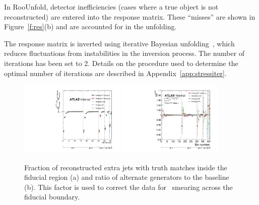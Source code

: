 In RooUnfold, detector inefficiencies (cases where a true object is not reconstructed) are entered into the response matrix.  These
``misses'' are shown in Figure~\ref{f:res}(b) and are accounted for in the unfolding. 

The response matrix is inverted using iterative Bayesian unfolding~\cite{DAgostini:1994zf}, which reduces fluctuations from instabilities in 
the inversion process. The number of iterations has been set to 2. Details on the procedure used to determine the optimal number of iterations are described in Appendix~\ref{app:stressiter}. 
\begin{figure}
\includegraphics[width=0.45\textwidth]{fig/Unfolding/FeedIn.pdf}
\includegraphics[width=0.45\textwidth]{fig/Unfolding/FeedInFrac.pdf}
\caption{Fraction of reconstructed extra jets with truth matches inside the fiducial region (a) and ratio of alternate generators to the baseline (b). This factor is used to correct the data for \pt\ smearing across the fiducial boundary.}
\label{fig:feedin}
\end{figure}

